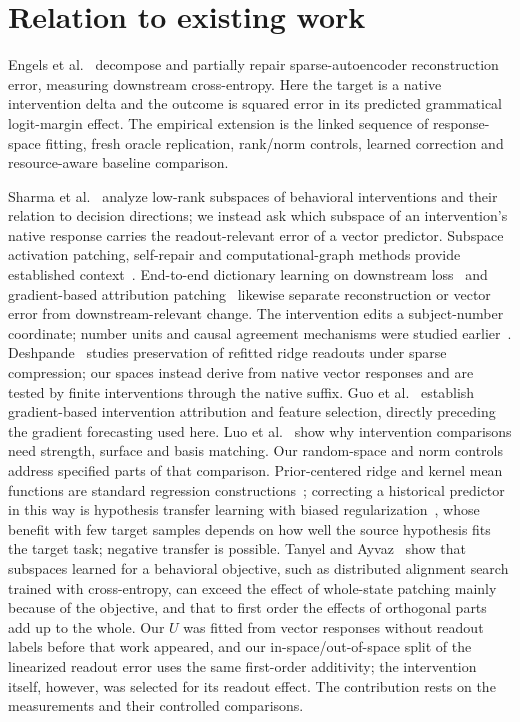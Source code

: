 \documentclass[11pt]{article}
\begin{document}
\section{Relation to existing work}
Engels et al.~\cite{engels2024} decompose and partially repair sparse-autoencoder reconstruction error, measuring downstream cross-entropy. Here the target is a native intervention delta and the outcome is squared error in its predicted grammatical logit-margin effect. The empirical extension is the linked sequence of response-space fitting, fresh oracle replication, rank/norm controls, learned correction and resource-aware baseline comparison.

Sharma et al.~\cite{sharma2026} analyze low-rank subspaces of behavioral interventions and their relation to decision directions; we instead ask which subspace of an intervention's native response carries the readout-relevant error of a vector predictor. Subspace activation patching, self-repair and computational-graph methods provide established context~\cite{makelov2023,rushing2024,ameisen2025,farnik2025}. End-to-end dictionary learning on downstream loss~\cite{braun2024} and gradient-based attribution patching~\cite{syed2023,kramar2024} likewise separate reconstruction or vector error from downstream-relevant change. The intervention edits a subject-number coordinate; number units and causal agreement mechanisms were studied earlier~\cite{lakretz2019,finlayson2021}. Deshpande~\cite{deshpande2026} studies preservation of refitted ridge readouts under sparse compression; our spaces instead derive from native vector responses and are tested by finite interventions through the native suffix. Guo et al.~\cite{guo2026} establish gradient-based intervention attribution and feature selection, directly preceding the gradient forecasting used here. Luo et al.~\cite{luo2026} show why intervention comparisons need strength, surface and basis matching. Our random-space and norm controls address specified parts of that comparison. Prior-centered ridge and kernel mean functions are standard regression constructions~\cite{rasmussen2006}; correcting a historical predictor in this way is hypothesis transfer learning with biased regularization~\cite{kuzborskij2013}, whose benefit with few target samples depends on how well the source hypothesis fits the target task; negative transfer is possible. Tanyel and Ayvaz~\cite{arxiv261105033} show that subspaces learned for a behavioral objective, such as distributed alignment search trained with cross-entropy, can exceed the effect of whole-state patching mainly because of the objective, and that to first order the effects of orthogonal parts add up to the whole. Our $U$ was fitted from vector responses without readout labels before that work appeared, and our in-space/out-of-space split of the linearized readout error uses the same first-order additivity; the intervention itself, however, was selected for its readout effect. The contribution rests on the measurements and their controlled comparisons.
\end{document}
